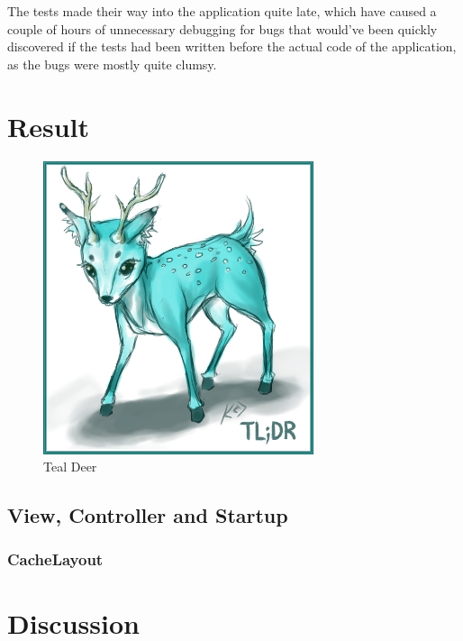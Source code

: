 \documentclass[a4paper]{scrreprt}
\begin{document}
The tests made their way into the application quite late, which have caused a couple of hours of unnecessary debugging for bugs that would've been quickly discovered if the tests had been written before the actual code of the application, as the bugs were mostly quite clumsy.

\chapter{Result}
\label{sec:result}

\begin{figure}[h]
  \begin{center}
    \includegraphics[scale=.5]{tldr.jpg}
    \caption{Teal Deer}
    \label{fig:sd}
  \end{center}
\end{figure}

\section{View, Controller and Startup}
\label{sec:sup}

\subsection{CacheLayout}


\chapter{Discussion}
\end{document}
